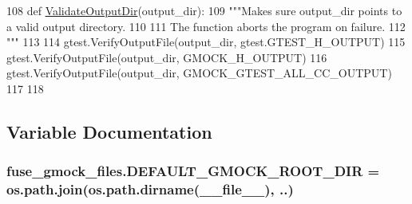 \begin{DoxyCode}
108 \textcolor{keyword}{def }\hyperlink{namespacefuse__gmock__files_a68581e210793099d656537faa719df29}{ValidateOutputDir}(output\_dir):
109   \textcolor{stringliteral}{"""Makes sure output\_dir points to a valid output directory.}
110 \textcolor{stringliteral}{}
111 \textcolor{stringliteral}{  The function aborts the program on failure.}
112 \textcolor{stringliteral}{  """}
113 
114   gtest.VerifyOutputFile(output\_dir, gtest.GTEST\_H\_OUTPUT)
115   gtest.VerifyOutputFile(output\_dir, GMOCK\_H\_OUTPUT)
116   gtest.VerifyOutputFile(output\_dir, GMOCK\_GTEST\_ALL\_CC\_OUTPUT)
117 
118 
\end{DoxyCode}


\subsection{Variable Documentation}
\subsubsection[{\texorpdfstring{D\+E\+F\+A\+U\+L\+T\+\_\+\+G\+M\+O\+C\+K\+\_\+\+R\+O\+O\+T\+\_\+\+D\+IR}{DEFAULT_GMOCK_ROOT_DIR}}]{\setlength{\rightskip}{0pt plus 5cm}fuse\+\_\+gmock\+\_\+files.\+D\+E\+F\+A\+U\+L\+T\+\_\+\+G\+M\+O\+C\+K\+\_\+\+R\+O\+O\+T\+\_\+\+D\+IR = os.\+path.\+join(os.\+path.\+dirname(\+\_\+\+\_\+file\+\_\+\+\_\+), \textquotesingle{}..\textquotesingle{})}\hypertarget{namespacefuse__gmock__files_a900b64b34e20c7430b72252192a3c7ed}{}\label{namespacefuse__gmock__files_a900b64b34e20c7430b72252192a3c7ed}
